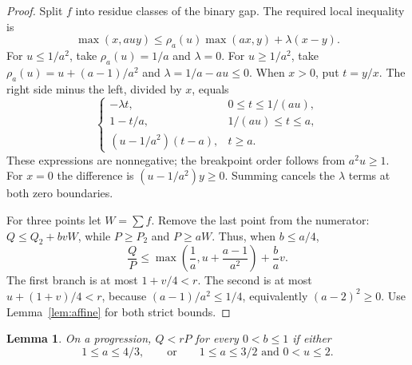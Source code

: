 \documentclass[11pt,a4paper]{article}
\newtheorem{lemma}[theorem]{Lemma}
\theoremstyle{remark}
\begin{document}
\begin{proof}
Split $f$ into residue classes of the binary gap. The required local
inequality is
\[
 \max(x,auy)\le\rho_a(u)\max(ax,y)+\lambda(x-y).
\]
For $u\le1/a^2$, take $\rho_a(u)=1/a$ and $\lambda=0$.
For $u\ge1/a^2$, take $\rho_a(u)=u+(a-1)/a^2$ and
$\lambda=1/a-au\le0$. When $x>0$, put $t=y/x$.
The right side minus the left, divided by $x$, equals
\[
 \begin{cases}
 -\lambda t,&0\le t\le1/(au),\\
 1-t/a,&1/(au)\le t\le a,\\
 (u-1/a^2)(t-a),&t\ge a.
 \end{cases}
\]
These expressions are nonnegative; the breakpoint order follows from
$a^2u\ge1$. For $x=0$ the difference is $(u-1/a^2)y\ge0$.
Summing cancels the $\lambda$ terms at both zero boundaries.

For three points let $W=\sum f$. Remove the last point from the numerator:
$Q\le Q_2+bvW$, while $P\ge P_2$ and $P\ge aW$.
Thus, when $b\le a/4$,
\[
 \frac QP\le\max\left(\frac1a,u+\frac{a-1}{a^2}\right)
                  +\frac ba v.
\]
The first branch is at most $1+v/4<r$.
The second is at most $u+(1+v)/4<r$, because
$(a-1)/a^2\le1/4$, equivalently $(a-2)^2\ge0$.
Use Lemma~\ref{lem:affine} for both strict bounds.
\end{proof}

\begin{lemma}\label{lem:moderate}
On a progression, $Q<rP$ for every $0<b\le1$ if either
\[
 1\le a\le4/3,
 \qquad\text{or}\qquad 1\le a\le3/2\text{ and }0<u\le2.
\]
\end{lemma}
\end{document}
